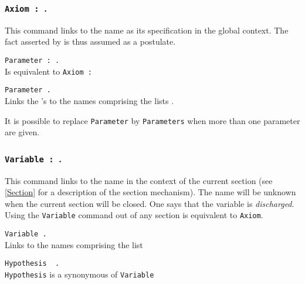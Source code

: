\subsubsection{{\tt Axiom {\ident} : {\term}}.}
\label{Axiom}
This command links {\term} to the name {\ident} as its specification in the
global context. The fact asserted by {\term} is thus assumed
as a postulate.

\begin{ErrMsgs}
\item {}
\end{ErrMsgs}

\begin{Variants} 
\item {\tt Parameter {\ident} : {\term}.}
  \\
  Is equivalent to {\tt Axiom {\ident} : {\term}}
\item {\tt Parameter \nelist{\nelistwithoutblank{\ident}{,} : {\term}}{;} {\tt .}} \\
  Links the {\term}'s to the names comprising the lists \nelist{\nelist{\ident}{,} : {\term}}{;}.
\end{Variants}

 It is possible to replace {\tt Parameter} by
{\tt Parameters} when more than one parameter are given.

\subsubsection{{\tt Variable {\ident} : {\term}}.}
This command links {\term} to the name {\ident} in the context of the
current section (see \ref{Section} for a description of the section
mechanism). The name {\ident} will be unknown when the current
section will be closed. One says that the variable is {\em
  discharged}. Using the {\tt Variable} command out of any section is
equivalent to {\tt Axiom}.

\begin{ErrMsgs}
\item {}
\end{ErrMsgs}

\begin{Variants}
\item {\tt Variable \nelist{\nelist{\ident}{,}:{\term}}{;} {\tt .}}\\
  Links {\term} to the
  names comprising the list \nelist{\nelist{\ident}{,}:{\term}}{;}
\item {\tt Hypothesis \nelist{\nelist{\ident}{,} $\;$:$\;$ {\term}}{;} {\tt
 .}} \\  %
  \texttt{Hypothesis} is a synonymous of \texttt{Variable}
\end{Variants}


